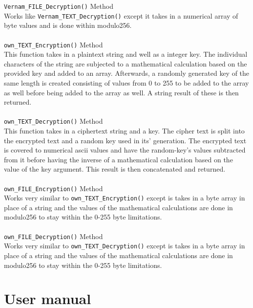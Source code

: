 \documentclass[a4paper, 12pt, titlepage]{report}
\begin{document}
\texttt{Vernam\_FILE\_Decryption()} Method\\
Works like \texttt{Vernam\_TEXT\_Decryption()} except it takes in a numerical array of byte values and is done within modulo256.
\\\\
\texttt{own\_TEXT\_Encryption()} Method\\
This function takes in a plaintext string and well as a integer key. The individual characters of the string are subjected to a mathematical calculation based on the provided key and added to an array. Afterwards, a randomly generated key of the same length is created consisting of values from 0 to 255 to be added to the array as well before being added to the array as well. A string result of these is then returned.
\\\\
\texttt{own\_TEXT\_Decryption()} Method\\
This function takes in a ciphertext string and a key. The cipher text is split into the encrypted text and a random key used in its' generation. The encrypted text is covered to numerical ascii values and have the random-key's values subtracted from it before having the inverse of a mathematical calculation based on the value of the key argument. This result is then concatenated and returned.
\\\\
\texttt{own\_FILE\_Encryption()} Method\\
Works very similar to \texttt{own\_TEXT\_Encryption()} except is takes in a byte array in place of a string and the values of the mathematical calculations are done in modulo256 to stay within the 0-255 byte limitations.
\\\\
\texttt{own\_FILE\_Decryption()} Method\\
Works very similar to \texttt{own\_TEXT\_Decryption()} except is takes in a byte array in place of a string and the values of the mathematical calculations are done in modulo256 to stay within the 0-255 byte limitations.
\chapter{User manual}
\end{document}
